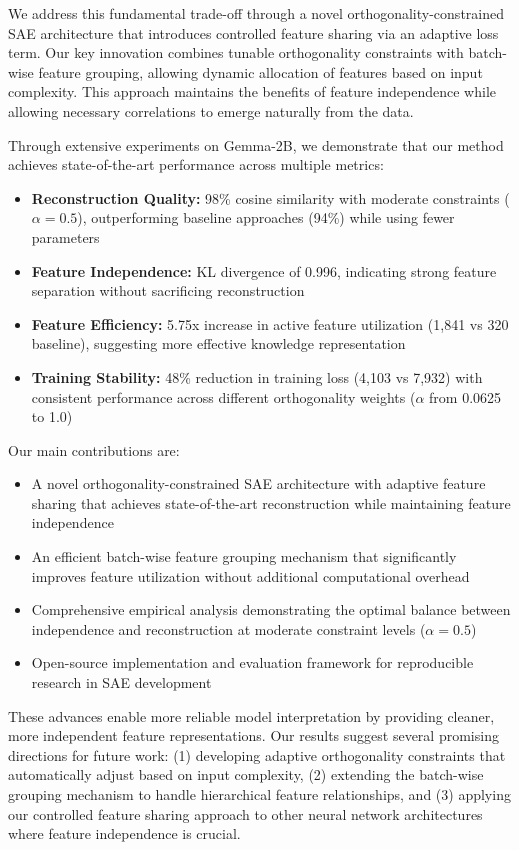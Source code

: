 \documentclass{article} %
\begin{document}
We address this fundamental trade-off through a novel orthogonality-constrained SAE architecture that introduces controlled feature sharing via an adaptive loss term. Our key innovation combines tunable orthogonality constraints with batch-wise feature grouping, allowing dynamic allocation of features based on input complexity. This approach maintains the benefits of feature independence while allowing necessary correlations to emerge naturally from the data.

Through extensive experiments on Gemma-2B, we demonstrate that our method achieves state-of-the-art performance across multiple metrics:

\begin{itemize}
    \item \textbf{Reconstruction Quality:} 98\% cosine similarity with moderate constraints ($\alpha=0.5$), outperforming baseline approaches (94\%) while using fewer parameters
    \item \textbf{Feature Independence:} KL divergence of 0.996, indicating strong feature separation without sacrificing reconstruction
    \item \textbf{Feature Efficiency:} 5.75x increase in active feature utilization (1,841 vs 320 baseline), suggesting more effective knowledge representation
    \item \textbf{Training Stability:} 48\% reduction in training loss (4,103 vs 7,932) with consistent performance across different orthogonality weights ($\alpha$ from 0.0625 to 1.0)
\end{itemize}

Our main contributions are:
\begin{itemize}
    \item A novel orthogonality-constrained SAE architecture with adaptive feature sharing that achieves state-of-the-art reconstruction while maintaining feature independence
    \item An efficient batch-wise feature grouping mechanism that significantly improves feature utilization without additional computational overhead
    \item Comprehensive empirical analysis demonstrating the optimal balance between independence and reconstruction at moderate constraint levels ($\alpha=0.5$)
    \item Open-source implementation and evaluation framework for reproducible research in SAE development
\end{itemize}

These advances enable more reliable model interpretation by providing cleaner, more independent feature representations. Our results suggest several promising directions for future work: (1) developing adaptive orthogonality constraints that automatically adjust based on input complexity, (2) extending the batch-wise grouping mechanism to handle hierarchical feature relationships, and (3) applying our controlled feature sharing approach to other neural network architectures where feature independence is crucial.
\end{document}
